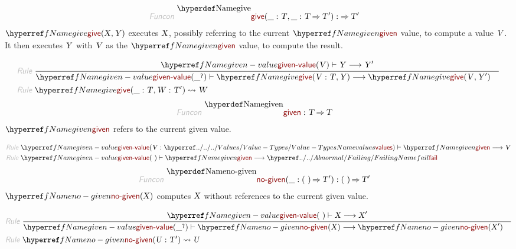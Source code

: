 \begin{align*}
  \KEY{Funcon} ~ 
  & \NAMEDECL{give}(\_ : \VAR{T}, \_ : \VAR{T} \TO \VAR{T}') :  \TO \VAR{T}'
\end{align*}
$\SHADE{\NAMEREF{give}
           ( \VAR{X},   
             \VAR{Y} )}$ executes $\SHADE{\VAR{X}}$, possibly referring to the current $\SHADE{\NAMEREF{given}}$ value,
  to compute a value $\SHADE{\VAR{V}}$. It then executes $\SHADE{\VAR{Y}}$ with $\SHADE{\VAR{V}}$ as the $\SHADE{\NAMEREF{given}}$ value,
  to compute the result.

\begin{align*}
  \KEY{Rule} ~ 
    & \RULE{
      \NAMEREF{given-value} ( \VAR{V} ) \vdash \VAR{Y} \TRANS 
        \VAR{Y}'
      }{
      & \NAMEREF{given-value} ( \_\QUERY ) \vdash \NAMEREF{give}
                      ( \VAR{V} : \VAR{T},   
                        \VAR{Y} ) \TRANS 
          \NAMEREF{give}
            ( \VAR{V},   
              \VAR{Y}' )
      }
\\
  \KEY{Rule} ~ 
    & \NAMEREF{give}
        ( \_ : \VAR{T},   
          \VAR{W} : \VAR{T}' ) \leadsto
        \VAR{W}
\end{align*}
\begin{align*}
  \KEY{Funcon} ~ 
  & \NAMEDECL{given} : \VAR{T} \TO \VAR{T}
\end{align*}
$\SHADE{\NAMEREF{given}}$ refers to the current given value.

\begin{align*}
  \KEY{Rule} ~ 
    & \NAMEREF{given-value} ( \VAR{V} : \NAMEHYPER{../../../Values}{Value-Types}{values} ) \vdash \NAMEREF{given} \TRANS 
        \VAR{V}
\\
  \KEY{Rule} ~ 
    & \NAMEREF{given-value} (  ~  ) \vdash \NAMEREF{given} \TRANS 
        \NAMEHYPER{../../Abnormal}{Failing}{fail}
\end{align*}
\begin{align*}
  \KEY{Funcon} ~ 
  & \NAMEDECL{no-given}(\_ : (  ~  ) \TO \VAR{T}') : (  ~  ) \TO \VAR{T}'
\end{align*}
$\SHADE{\NAMEREF{no-given}
           ( \VAR{X} )}$ computes $\SHADE{\VAR{X}}$ without references to the current given value.

\begin{align*}
  \KEY{Rule} ~ 
    & \RULE{
      \NAMEREF{given-value} (  ~  ) \vdash \VAR{X} \TRANS 
        \VAR{X}'
      }{
      & \NAMEREF{given-value} ( \_\QUERY ) \vdash \NAMEREF{no-given}
                      ( \VAR{X} ) \TRANS 
          \NAMEREF{no-given}
            ( \VAR{X}' )
      }
\\
  \KEY{Rule} ~ 
    & \NAMEREF{no-given}
        ( \VAR{U} : \VAR{T}' ) \leadsto
        \VAR{U}
\end{align*}
